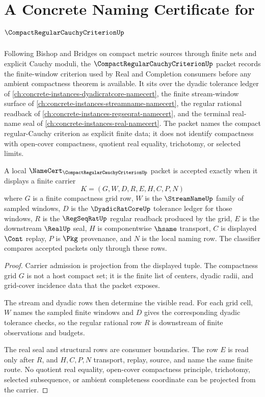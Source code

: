 \chapter{A Concrete Naming Certificate for $\CompactRegularCauchyCriterionUp$}
\label{ch:concrete-instances-compact-regular-cauchy-criterion-namecert}

Following Bishop and Bridges on compact metric sources through finite nets and explicit Cauchy moduli, the $\CompactRegularCauchyCriterionUp$ packet records the finite-window criterion used by Real and Completion consumers before any ambient compactness theorem is available. It sits over the dyadic tolerance ledger of \autoref{ch:concrete-instances-dyadicratcore-namecert}, the finite stream-window surface of \autoref{ch:concrete-instances-streamname-namecert}, the regular rational readback of \autoref{ch:concrete-instances-regseqrat-namecert}, and the terminal real-name seal of \autoref{ch:concrete-instances-real-namecert}. The packet names the compact regular-Cauchy criterion as explicit finite data; it does not identify compactness with open-cover compactness, quotient real equality, trichotomy, or selected limits.

\begin{theorem}
\label{thm:compact-regular-cauchy-criterion-namecert-obligations}
A local $\NameCert_{\CompactRegularCauchyCriterionUp}$ packet is accepted exactly when it displays a finite carrier
$$
K=(G,W,D,R,E,H,C,P,N)
$$
where $G$ is a finite compactness grid row, $W$ is the $\StreamNameUp$ family of sampled windows, $D$ is the $\DyadicRatCoreUp$ tolerance ledger for those windows, $R$ is the $\RegSeqRatUp$ regular readback produced by the grid, $E$ is the downstream $\RealUp$ seal, $H$ is componentwise $\hsame$ transport, $C$ is displayed $\Cont$ replay, $P$ is $\Pkg$ provenance, and $N$ is the local naming row. The classifier compares accepted packets only through these rows.
\end{theorem}
\begin{proof}
Carrier admission is projection from the displayed tuple. The compactness grid $G$ is not a host compact set; it is the finite list of centers, dyadic radii, and grid-cover incidence data that the packet exposes.

The stream and dyadic rows then determine the visible read. For each grid cell, $W$ names the sampled finite windows and $D$ gives the corresponding dyadic tolerance checks, so the regular rational row $R$ is downstream of finite observations and budgets.

The real seal and structural rows are consumer boundaries. The row $E$ is read only after $R$, and $H,C,P,N$ transport, replay, source, and name the same finite route. No quotient real equality, open-cover compactness principle, trichotomy, selected subsequence, or ambient completeness coordinate can be projected from the carrier.
\end{proof}

